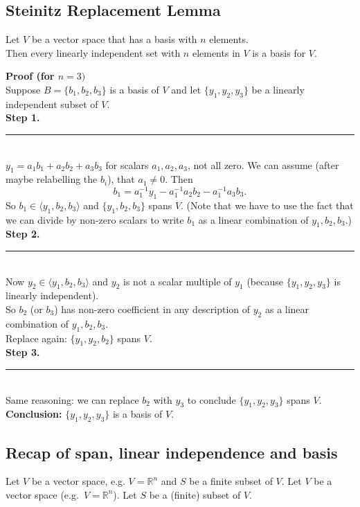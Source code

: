 \documentclass[a4paper, 9pt]{extarticle}
\begin{document}
\subsection{Steinitz Replacement Lemma}
\begin{lemmabox}{}{}
  Let $V$ be a vector space that has a basis with $n$ elements. \\[2ex]

  Then every linearly independent set with $n$ elements in $V$ is a basis for $V$.
\end{lemmabox}
\noindent \textbf{Proof (for $n = 3)$} \\
Suppose $B = \{b_1, b_2, b_3\}$ is a basis of $V$ and let $\{y_1, y_2, y_3\}$ be a linearly independent subset of $V$. \\[2ex]
\textbf{Step 1.} \rule[.25\baselineskip]{\textwidth}{0.5px}\\
$y_1 = a_1 b_1 + a_2 b_2 + a_3 b_3$ for scalars $a_1, a_2, a_3$, not all zero.
We can assume (after maybe relabelling the $b_i$), that $a_1 \ne 0$.
Then
$$
  b_1 = a_1^{-1} y_1 - a_1^{-1} a_2 b_2 - a_1^{-1} a_3 b_3.
$$
So $b_1 \in \langle y_1, b_2, b_3 \rangle$ and $\{y_1, b_2, b_3\}$ spans $V$.
(Note that we have to use the fact that we can divide by non-zero scalars to write $b_1$ as a linear combination of $y_1, b_2, b_3$.) \\[2ex]
\textbf{Step 2.} \rule[.25\baselineskip]{\textwidth}{0.5px}\\
Now $y_2 \in \langle y_1, b_2, b_3 \rangle$ and $y_2$ is not a scalar multiple of $y_1$ (because $\{y_1, y_2, y_3\}$ is linearly independent). \\
So $b_2$ (or $b_3$) has non-zero coefficient in any description of $y_2$ as a linear combination of $y_1, b_2, b_3$. \\
Replace again: $\{y_1, y_2, b_2\}$ spans $V$. \\[2ex]
\textbf{Step 3.} \rule[.25\baselineskip]{\textwidth}{0.5px}\\
Same reasoning: we can replace $b_2$ with $y_3$ to conclude $\{y_1, y_2, y_3\}$ spans $V$. \\[2ex]
\textbf{Conclusion:} $\{y_1, y_2, y_3\}$ is a basis of $V$.
\subsection{Recap of span, linear independence and basis}
Let $V$ be a vector space, e.g. $V = \mathbb{R}^n$ and $S$ be a finite subset of $V$.
Let $V$ be a vector space (e.g.\ $V = \mathbb{R}^n$). Let $S$ be a (finite) subset of $V$.
\end{document}
